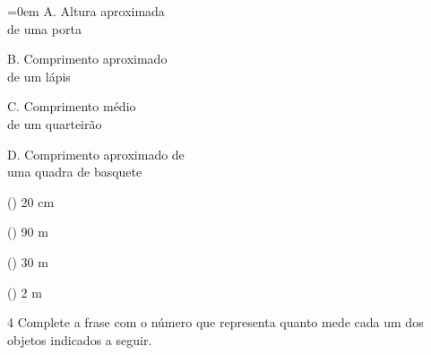\begin{multicols}{2}\parindent=0em
A. Altura aproximada\\
de uma porta\bigskip

B. Comprimento aproximado\\
de um lápis\bigskip

C. Comprimento médio\\
de um quarteirão\bigskip

D. Comprimento aproximado de\\
uma quadra de basquete

\columnbreak

(\hspace{2em}) 20 cm\bigskip

(\hspace{2em}) 90 m\bigskip

(\hspace{2em}) 30 m\bigskip

(\hspace{2em}) 2 m
\end{multicols}



\pagebreak

\num{4} Complete a frase com o número que representa quanto mede cada um dos
objetos indicados a seguir.

